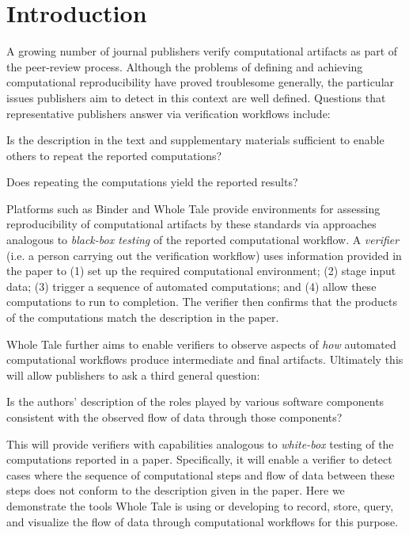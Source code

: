\vspace*{-2em}

\section{Introduction}

A growing number of journal publishers verify computational artifacts as part of the peer-review process. Although the problems of defining and achieving computational reproducibility have proved troublesome generally, the particular issues publishers aim to detect in this context are well defined. Questions that representative publishers answer via verification workflows include:

\begin{itemize}

\tinyitem Is the description in the text and supplementary materials sufficient to enable others to repeat the reported computations?

\tinyitem Does repeating the computations yield the reported results?

\end{itemize}

Platforms such as Binder \cite{Binder_2018} and Whole Tale  \cite{brinckman2019computing} provide environments for assessing reproducibility of computational artifacts by these standards via approaches analogous to \emph{black-box testing} of the reported computational workflow. A \emph{verifier} (i.e. a person carrying out the verification workflow) uses information provided in the paper to (1) set up the required computational environment; (2) stage input data; (3) trigger a sequence of automated computations; and (4) allow these computations to run to completion. The verifier then confirms that the products of the computations match the description in the paper.

Whole Tale further aims to enable verifiers to observe aspects of \emph{how} automated computational workflows produce intermediate and final artifacts. Ultimately this will allow publishers to ask a third general question:

\begin{itemize}

\tinyitem Is the authors' description of the roles played by various software components consistent with the observed flow of data through those components?

\end{itemize}

This will provide verifiers with capabilities analogous to \emph{white-box} testing of the computations reported in a paper. Specifically, it will enable a verifier to detect cases where the sequence of computational steps and flow of data between these steps does not conform to the description given in the paper. Here we demonstrate the tools Whole Tale is using or developing to record, store, query, and visualize the flow of data through computational workflows for this purpose.









